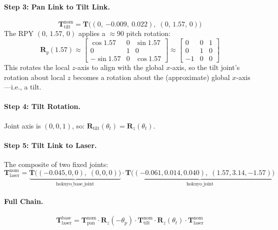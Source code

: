 \documentclass[12pt,a4paper]{article}
\newcommand{\T}{\mathbf{T}}
\newcommand{\Rot}{\mathbf{R}}
\newcommand{\Rz}{\mathbf{R}_z}
\begin{document}
\paragraph{Step 3: Pan Link to Tilt Link.}
\begin{equation}
    \T_{\text{tilt}}^{\text{nom}} = \T\bigl((0,\ {-0.009},\ 0.022),\; (0,\, 1.57,\, 0)\bigr)
\end{equation}
The RPY $(0,\, 1.57,\, 0)$ applies a $\approx 90$\textdegree{} pitch rotation:
\begin{equation}
    \Rot_y(1.57) \approx
    \begin{bmatrix}
        \cos 1.57 & 0 & \sin 1.57 \\
        0 & 1 & 0 \\
        -\sin 1.57 & 0 & \cos 1.57
    \end{bmatrix}
    \approx
    \begin{bmatrix}
        0 & 0 & 1 \\
        0 & 1 & 0 \\
        -1 & 0 & 0
    \end{bmatrix}
\end{equation}
This rotates the local $z$-axis to align with the global $x$-axis,
so the tilt joint's rotation about local $z$ becomes a rotation about
the (approximate) global $x$-axis---i.e., a tilt.

\paragraph{Step 4: Tilt Rotation.}
Joint axis is $(0,0,1)$, so:
$\Rot_{\text{tilt}}(\theta_t) = \Rz(\theta_t)$.

\paragraph{Step 5: Tilt Link to Laser.}
The composite of two fixed joints:
\begin{equation}
    \T_{\text{laser}}^{\text{nom}} =
    \underbrace{\T\bigl((-0.045, 0, 0),\; (0,0,0)\bigr)}_{\text{hokuyo\_base\_joint}}
    \cdot
    \underbrace{\T\bigl((-0.061, 0.014, 0.040),\; (1.57, 3.14, -1.57)\bigr)}_{\text{hokuyo\_joint}}
\end{equation}

\paragraph{Full Chain.}
\begin{equation}
    \T_{\text{laser}}^{\text{base}} =
    \T_{\text{pan}}^{\text{nom}} \cdot
    \Rz(-\theta_p) \cdot
    \T_{\text{tilt}}^{\text{nom}} \cdot
    \Rz(\theta_t) \cdot
    \T_{\text{laser}}^{\text{nom}}
\end{equation}
\end{document}
